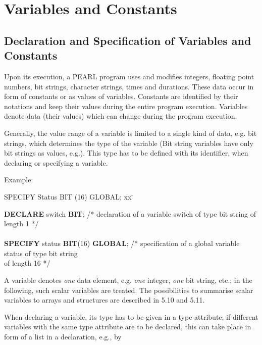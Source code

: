 \chapter{Variables and Constants}  %

\section{Declaration and Specification of Variables and Constants}  %

Upon its execution, a PEARL program uses and modifies integers, floating
point numbers, bit strings, character strings, times and durations.
These data occur in form of constants or as values of variables.
Constants are identified by their notations and keep their values during
the entire program execution. Variables denote data (their values) which
can change during the program execution.

Generally, the value range of a variable is limited to a single kind of data,
e.g. bit strings, which determines the type of the variable (Bit string
variables have only bit strings as values, e.g.). This type has to be
defined with its identifier, when declaring or specifying a
variable.

Example:

\begin{tabbing}
SPECIFY Status BIT (16) GLOBAL; xx \= \kill

{\bf DECLARE} switch {\bf BIT}; \> /* declaration of a variable
                                   switch of type bit string of  \\
                                \> length 1 */ \\
                                \> \\
{\bf SPECIFY} status {\bf BIT}(16) {\bf GLOBAL};
                                \> /* specification of a global
                                   variable status of type bit string \\
                                \> of length 16 */
\end{tabbing}

A variable denotes {\it one} data element, e.g. {\it one} integer, {\it
one} bit string, etc.; in the following, such scalar variables are
treated. The possibilities to summarise scalar variables to arrays and
structures are described in 5.10 and 5.11.

When declaring a variable, its type has to be given in a type attribute;
if different variables with the same type attribute are to be declared,
this can take place in form of a list in a declaration, e.g., by

